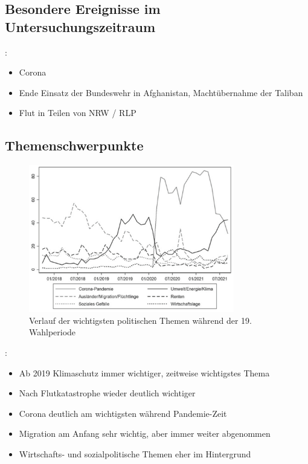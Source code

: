\subsection{Besondere Ereignisse im Untersuchungszeitraum}


\citeauthor{schmid_deutscher_2021} \autocite{schmid_deutscher_2021}:
\begin{itemize}
    \item Corona
    \item Ende Einsatz der Bundeswehr in Afghanistan, Machtübernahme der Taliban
    \item Flut in Teilen von NRW / RLP
\end{itemize}

\subsection{Themenschwerpunkte}

\begin{figure}[H]
    \centering
    \includegraphics[width=0.8\textwidth]{data/images/themenkonjunktur.png}
    \caption{Verlauf der wichtigsten politischen Themen während der 19. Wahlperiode \autocite{engler_wettbewerb_2022, forschungsgruppe_wahlen_forschungsgruppe_nodate}} \label{fig:themenkonjunktur}
\end{figure}

\citeauthor{engler_wettbewerb_2022} \autocite{engler_wettbewerb_2022}:
\begin{itemize}
    \item Ab \num{2019} Klimaschutz immer wichtiger, zeitweise wichtigstes Thema
    \item Nach Flutkatastrophe wieder deutlich wichtiger
    \item Corona deutlich am wichtigsten während Pandemie-Zeit
    \item Migration am Anfang sehr wichtig, aber immer weiter abgenommen
    \item Wirtschafts- und sozialpolitische Themen eher im Hintergrund
\end{itemize}

